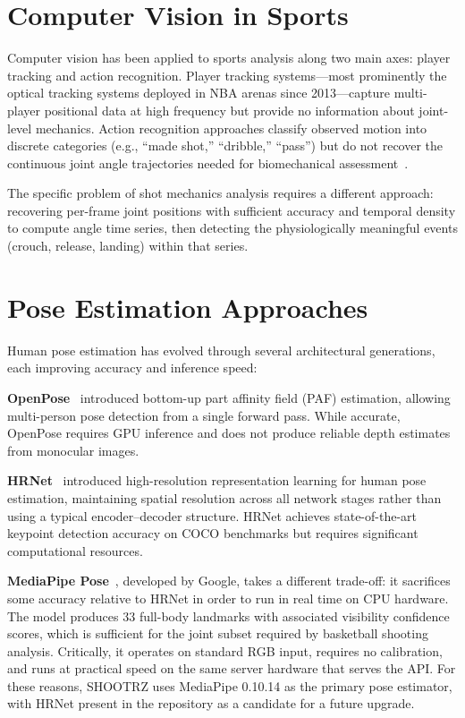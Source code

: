 \section{Computer Vision in Sports}
\label{sec:cv_sports}

Computer vision has been applied to sports analysis along two main axes: player tracking and action recognition. Player tracking systems---most prominently the optical tracking systems deployed in NBA arenas since 2013---capture multi-player positional data at high frequency but provide no information about joint-level mechanics. Action recognition approaches classify observed motion into discrete categories (e.g., ``made shot,'' ``dribble,'' ``pass'') but do not recover the continuous joint angle trajectories needed for biomechanical assessment~\cite{Rao2020}.

The specific problem of shot mechanics analysis requires a different approach: recovering per-frame joint positions with sufficient accuracy and temporal density to compute angle time series, then detecting the physiologically meaningful events (crouch, release, landing) within that series.

\section{Pose Estimation Approaches}
\label{sec:pose_estimation}

Human pose estimation has evolved through several architectural generations, each improving accuracy and inference speed:

\textbf{OpenPose}~\cite{Cao2017} introduced bottom-up part affinity field (PAF) estimation, allowing multi-person pose detection from a single forward pass. While accurate, OpenPose requires GPU inference and does not produce reliable depth estimates from monocular images.

\textbf{HRNet}~\cite{Sun2019} introduced high-resolution representation learning for human pose estimation, maintaining spatial resolution across all network stages rather than using a typical encoder--decoder structure. HRNet achieves state-of-the-art keypoint detection accuracy on COCO benchmarks but requires significant computational resources.

\textbf{MediaPipe Pose}~\cite{Lugaresi2019}, developed by Google, takes a different trade-off: it sacrifices some accuracy relative to HRNet in order to run in real time on CPU hardware. The model produces 33 full-body landmarks with associated visibility confidence scores, which is sufficient for the joint subset required by basketball shooting analysis. Critically, it operates on standard RGB input, requires no calibration, and runs at practical speed on the same server hardware that serves the API. For these reasons, SHOOTRZ uses MediaPipe 0.10.14 as the primary pose estimator, with HRNet present in the repository as a candidate for a future upgrade.

